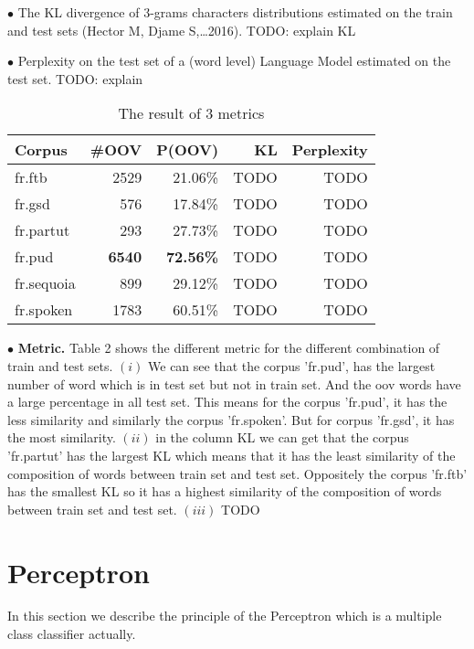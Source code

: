 \documentclass{article}
\begin{document}
$\bullet$ The KL divergence of 3-grams characters distributions estimated on the train and test sets (Hector M, Djame S,\dots 2016). TODO: explain KL

$\bullet$ Perplexity on the test set of a (word level) Language Model estimated on the test set. TODO: explain

\begin{table}[h]
    \caption{The result of 3 metrics}
    \vspace{5pt}
    \centering
    
\begin{tabular}{|l|rr|r|r|}
\hline
Corpus & \#OOV & P(OOV) & KL & Perplexity\\
\hline
fr.ftb     & 2529 & 21.06\% & TODO & TODO \\
fr.gsd     & 576 & 17.84\% & TODO  & TODO\\
fr.partut  & 293   & 27.73\%  & TODO  & TODO\\
fr.pud     & \textbf{6540}   & \textbf{72.56\%}  & TODO & TODO\\
fr.sequoia & 899  & 29.12\%  &  TODO & TODO\\
fr.spoken  & 1783  & 60.51\%  & TODO  &TODO \\
\hline
\end{tabular}
\label{table_matric}
\end{table}

$\bullet$ \textbf{Metric.} Table 2 shows the different metric for the different combination of train and test sets. $(i)$ We can see that the corpus 'fr.pud', has the largest number of word which is in test set but not in train set. And the oov words have a large percentage in all test set. This means for the corpus 'fr.pud', it has the less similarity and similarly the corpus 'fr.spoken'. But for corpus 'fr.gsd', it has the most similarity. $(ii)$ in the column KL we can get that the corpus 'fr.partut' has the largest KL which means that it has the least similarity of the composition of words between train set and test set. Oppositely the corpus 'fr.ftb' has the smallest KL so it has a highest similarity of the composition of words between train set and test set. $(iii)$ TODO



\section{Perceptron}
In this section we describe the principle of the Perceptron which is a multiple class classifier actually.
\end{document}
